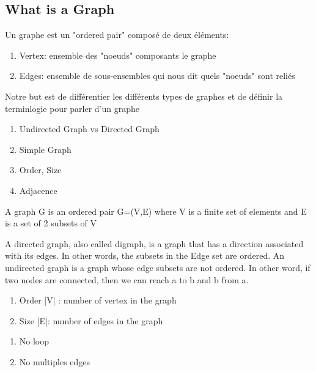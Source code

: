 \documentclass{article}
\begin{document}
\subsection{What is a Graph}%
\label{sub:What is a Graph}

Un graphe est un "ordered pair" composé de deux éléments:
\begin{enumerate}
    \item Vertex: ensemble des "noeuds" composants le graphe
    \item Edges: ensemble de sous-ensembles qui nous dit quels "noeuds"
	sont reliés
\end{enumerate}

Notre but est de différentier les différents types de graphes et de
définir la terminlogie pour parler d'un graphe
\begin{enumerate}
    \item Undirected Graph vs Directed Graph
    \item Simple Graph
    \item Order, Size
    \item Adjacence
\end{enumerate}

\begin{definition}[Graph]
    A graph G is an ordered pair G=(V,E) where V is a finite set of
    elements and E is a set of 2 subsets of V
\end{definition}

\begin{definition}
    A directed graph, also called digraph, is a graph that has a
    direction associated with its edges. In other words, the subsets
    in the Edge set are ordered.
    An undirected graph is a graph whose edge subsets are not ordered.
    In other word, if two nodes are connected, then we can reach a to b
    and b from a.
\end{definition}

\begin{definition}
    \begin{enumerate}
        \item Order |V| : number of vertex in the graph
	\item Size |E|: number of edges in the graph
    \end{enumerate}
\end{definition}

\begin{definition}
    \begin{enumerate}
        \item No loop
	\item No multiples edges
    \end{enumerate}
\end{definition}
\end{document}
